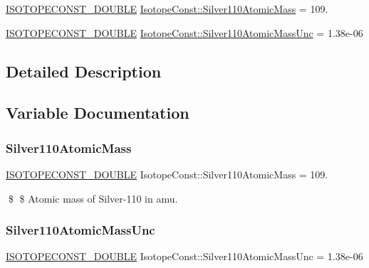 \begin{DoxyCompactItemize}
\item 
\mbox{\hyperlink{group___isotope_const-_macros_ga8f45a7272ce02c0b4c65c44636ed719a}{I\+S\+O\+T\+O\+P\+E\+C\+O\+N\+S\+T\+\_\+\+D\+O\+U\+B\+LE}} \mbox{\hyperlink{group___isotope_const-_silver-_ag110_ga36cf44f34133926286a98874877f4560}{Isotope\+Const\+::\+Silver110\+Atomic\+Mass}} = 109.
\item 
\mbox{\hyperlink{group___isotope_const-_macros_ga8f45a7272ce02c0b4c65c44636ed719a}{I\+S\+O\+T\+O\+P\+E\+C\+O\+N\+S\+T\+\_\+\+D\+O\+U\+B\+LE}} \mbox{\hyperlink{group___isotope_const-_silver-_ag110_gae80bdfe1fa52adb0c5a775686c17e7f2}{Isotope\+Const\+::\+Silver110\+Atomic\+Mass\+Unc}} = 1.\+38e-\/06
\end{DoxyCompactItemize}


\subsection{Detailed Description}


\subsection{Variable Documentation}
\mbox{\label{group___isotope_const-_silver-_ag110_ga36cf44f34133926286a98874877f4560}} 
\subsubsection{\texorpdfstring{Silver110\+Atomic\+Mass}{Silver110AtomicMass}}
{\footnotesize\ttfamily \mbox{\hyperlink{group___isotope_const-_macros_ga8f45a7272ce02c0b4c65c44636ed719a}{I\+S\+O\+T\+O\+P\+E\+C\+O\+N\+S\+T\+\_\+\+D\+O\+U\+B\+LE}} Isotope\+Const\+::\+Silver110\+Atomic\+Mass = 109.}

\$ \$ Atomic mass of Silver-\/110 in amu. \mbox{\label{group___isotope_const-_silver-_ag110_gae80bdfe1fa52adb0c5a775686c17e7f2}} 
\subsubsection{\texorpdfstring{Silver110\+Atomic\+Mass\+Unc}{Silver110AtomicMassUnc}}
{\footnotesize\ttfamily \mbox{\hyperlink{group___isotope_const-_macros_ga8f45a7272ce02c0b4c65c44636ed719a}{I\+S\+O\+T\+O\+P\+E\+C\+O\+N\+S\+T\+\_\+\+D\+O\+U\+B\+LE}} Isotope\+Const\+::\+Silver110\+Atomic\+Mass\+Unc = 1.\+38e-\/06}

